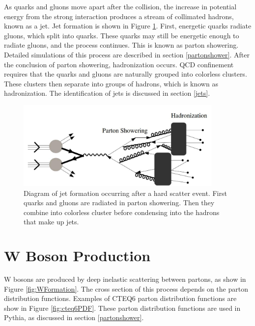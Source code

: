 \documentclass[oneside, letterpaper, oldfontcommands]{memoir}
\begin{document}
\qquad As quarks and gluons move apart after the collision, the increase in potential energy from the strong interaction produces a stream of collimated hadrons, known as a jet. Jet formation is shown in Figure \ref{fig:JetFormation}. First, energetic quarks radiate gluons, which split into quarks. These quarks may still be energetic enough to radiate gluons, and the process continues. This is known as parton showering. Detailed simulations of this process are described in section \ref{partonshower}. After the conclusion of parton showering, hadronization occurs. QCD confinement requires that the quarks and gluons are naturally grouped into colorless clusters. These clusters then separate into groups of hadrons, which is known as hadronization. The identification of jets is discussed in section \ref{jets}. 

\begin{figure}[here]
\includegraphics[width=0.9\textwidth]{jetformation.jpg}
\caption{Diagram of jet formation occurring after a hard scatter event. First quarks and gluons are radiated in parton showering. Then they combine into colorless cluster before condensing into the hadrons that make up jets.}
\label{fig:JetFormation}
\end{figure}



\section{W Boson Production}\label{wboson}
\qquad W bosons are produced by deep inelastic scattering between partons, as show in Figure \ref{fig:WFormation}. The cross section of this process depends on the parton distribution functions. Examples of CTEQ6 parton distribution functions are show in Figure \ref{fig:cteq6PDF}\cite{Pumplin:2002vw}. These parton distribution functions are used in {\sc Pythia}, as discussed in section \ref{partonshower}.
\end{document}
